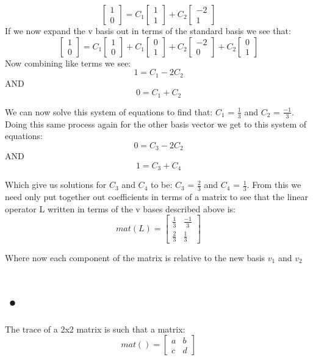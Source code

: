\documentclass[12pt]{article}
\begin{document}
\[
\begin{bmatrix}
1\\
0
\end{bmatrix}
=
C_1
\begin{bmatrix}
1\\
1
\end{bmatrix}
+
C_2
\begin{bmatrix}
-2\\
1
\end{bmatrix}
\]
If we now expand the v basis out in terms of the standard basis we see that:
\[
\begin{bmatrix}
1\\
0
\end{bmatrix}
=
C_1
\begin{bmatrix}
1\\
0
\end{bmatrix}
+C_1
\begin{bmatrix}
0\\
1
\end{bmatrix}
+
C_2
\begin{bmatrix}
-2\\
0
\end{bmatrix}
+
C_2
\begin{bmatrix}
0\\
1
\end{bmatrix}
\]
Now combining like terms we see:
$$ 1 = C_1 - 2 C_2 $$
AND
$$ 0 = C_1 + C_2 $$

We can now solve this system of equations to find that: $C_1$ = $\frac{1}{3}$ and $C_2$ = $\frac{-1}{3}$. Doing this same process again for the other basis vector we get to this system of equations:
$$ 0 = C_3 - 2 C_2$$
AND
$$ 1 = C_3 + C_4 $$

Which give us solutions for $C_3$ and $C_4$ to be: $C_3$ = $\frac{2}{3}$ and $C_4$ = $\frac{1}{3}$. From this we need only put together out coefficients in terms of a matrix to see that the linear operator L written in terms of the v bases described above is: 
\[
mat(L) = 
\begin{bmatrix}
\frac{1}{3} & \frac{-1}{3}\\
\frac{2}{3} & \frac{1}{3}
\end{bmatrix}
\]

Where now each component of the matrix is relative to the new basis $v_1$ and $v_2$

\section{•}
The trace of a 2x2 matrix is such that a matrix:
\[
mat() = 
\begin{bmatrix}
a & b\\
c & d
\end{bmatrix}
\]
\end{document}
